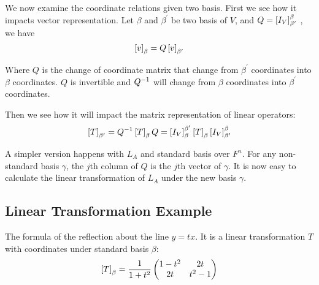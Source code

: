We now examine the coordinate relations given two basis. First we see how it impacts vector representation. Let $\beta$ and $\beta^{\prime}$ be two basis of $V$, and $Q=\coordinate{I_V}_{\beta^\prime}^\beta$ , we have 
\begin{equation}
    \coordinate{v}_\beta = Q \coordinate{v}_{\beta^\prime}
\end{equation}

Where $Q$ is the change of coordinate matrix that change from $\beta^\prime$ coordinates into $\beta$ coordinates. $Q$ is invertible and ${Q}^{-1}$ will change from $\beta$ coordinates into $\beta^\prime$ coordinates. 

Then we see how it will impact the matrix representation of linear operators:
\begin{equation}\label{change_of_coordinate_formula}
    \coordinate{T}_{\beta^\prime} = \inverse{Q} \coordinate{T}_{\beta} Q = \coordinate{I_V}_\beta^{\beta^\prime} \coordinate{T}_\beta \coordinate{I_V}_{\beta^\prime}^\beta
\end{equation}

A simpler version happens with $L_A$ and standard basis over $F^n$. For any non-standard basis $\gamma$, the $j$th column of $Q$ is the $j$th vector of $\gamma$. It is now easy to calculate the linear transformation of $L_A$ under the new basis $\gamma$.


\subsection{Linear Transformation Example}

\begin{example}
    The formula of the reflection about the line $y=tx$. It is a linear transformation $T$ with coordinates under standard basis $\beta$:
    \begin{equation*}
        \coordinate{T}_\beta = \frac{1}{1 + t^2} \begin{pmatrix}
            1-t^2 & 2t \\
            2t & t^2 -1
        \end{pmatrix}
    \end{equation*}
\end{example}


